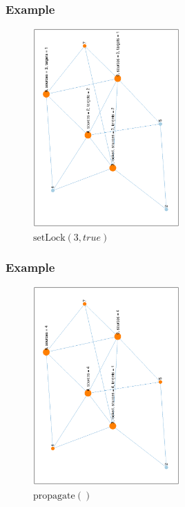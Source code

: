 \documentclass{beamer}
\begin{document}
\begin{frame}
	\frametitle{Example}
	\begin{figure}
		\centering
		\includegraphics[width=0.5\textwidth,angle=-90]{../paper/graph/example/4.eps}
		\caption{$ \mathrm{setLock}(3, \mathit{true}) $}
	\end{figure}
\end{frame}

\begin{frame}
	\frametitle{Example}
	\begin{figure}
		\centering
		\includegraphics[width=0.5\textwidth,angle=-90]{../paper/graph/example/5.eps}
		\caption{$ \mathrm{propagate}() $}
	\end{figure}
\end{frame}
\end{document}
